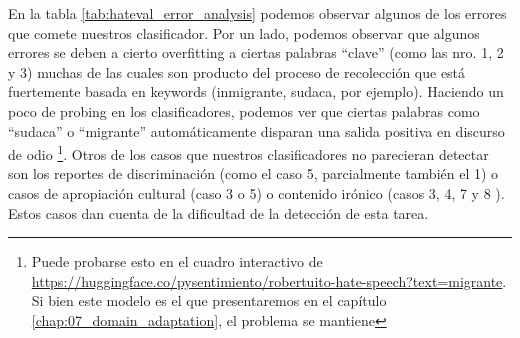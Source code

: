 En la tabla \ref{tab:hateval_error_analysis} podemos observar algunos de los errores que comete nuestros clasificador. Por un lado, podemos observar que algunos errores se deben a cierto overfitting a ciertas palabras ``clave'' (como las nro. 1, 2 y 3) muchas de las cuales son producto del proceso de recolección que está fuertemente basada en keywords (inmigrante, sudaca, por ejemplo). Haciendo un poco de probing en los clasificadores, podemos ver que ciertas palabras como ``sudaca'' o ``migrante'' automáticamente disparan una salida positiva en discurso de odio \footnote{Puede probarse esto en el cuadro interactivo de \url{https://huggingface.co/pysentimiento/robertuito-hate-speech?text=migrante}. Si bien este modelo es el que presentaremos en el capítulo \ref{chap:07_domain_adaptation}, el problema se mantiene}. Otros de los casos que nuestros clasificadores no parecieran detectar son los reportes de discriminación (como el caso 5, parcialmente también el 1) o casos de apropiación cultural (caso 3 o 5) o contenido irónico (casos 3, 4, 7 y 8 ). Estos casos dan cuenta de la dificultad de la detección de esta tarea.


